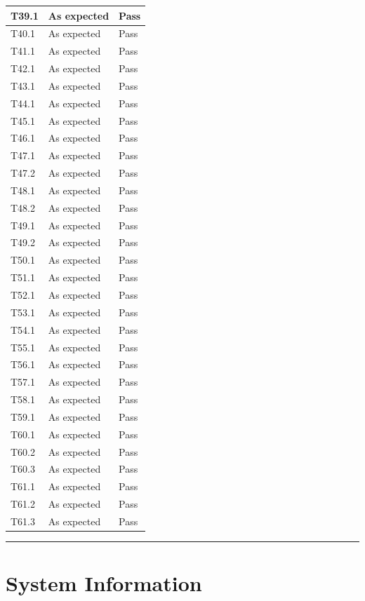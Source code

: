 \documentclass[
]{article}
\begin{document}
\begin{longtable}{l|l|l}
\hline
T39.1 & As expected & Pass\\
\hline
T40.1 & As expected & Pass\\
\hline
T41.1 & As expected & Pass\\
\hline
T42.1 & As expected & Pass\\
\hline
T43.1 & As expected & Pass\\
\hline
T44.1 & As expected & Pass\\
\hline
T45.1 & As expected & Pass\\
\hline
T46.1 & As expected & Pass\\
\hline
T47.1 & As expected & Pass\\
\hline
T47.2 & As expected & Pass\\
\hline
T48.1 & As expected & Pass\\
\hline
T48.2 & As expected & Pass\\
\hline
T49.1 & As expected & Pass\\
\hline
T49.2 & As expected & Pass\\
\hline
T50.1 & As expected & Pass\\
\hline
T51.1 & As expected & Pass\\
\hline
T52.1 & As expected & Pass\\
\hline
T53.1 & As expected & Pass\\
\hline
T54.1 & As expected & Pass\\
\hline
T55.1 & As expected & Pass\\
\hline
T56.1 & As expected & Pass\\
\hline
T57.1 & As expected & Pass\\
\hline
T58.1 & As expected & Pass\\
\hline
T59.1 & As expected & Pass\\
\hline
T60.1 & As expected & Pass\\
\hline
T60.2 & As expected & Pass\\
\hline
T60.3 & As expected & Pass\\
\hline
T61.1 & As expected & Pass\\
\hline
T61.2 & As expected & Pass\\
\hline
T61.3 & As expected & Pass\\
\hline
\end{longtable}

\begin{center}\rule{0.5\linewidth}{0.5pt}\end{center}

\hypertarget{system-information}{%
\section{System Information}\label{system-information}}
\end{document}
